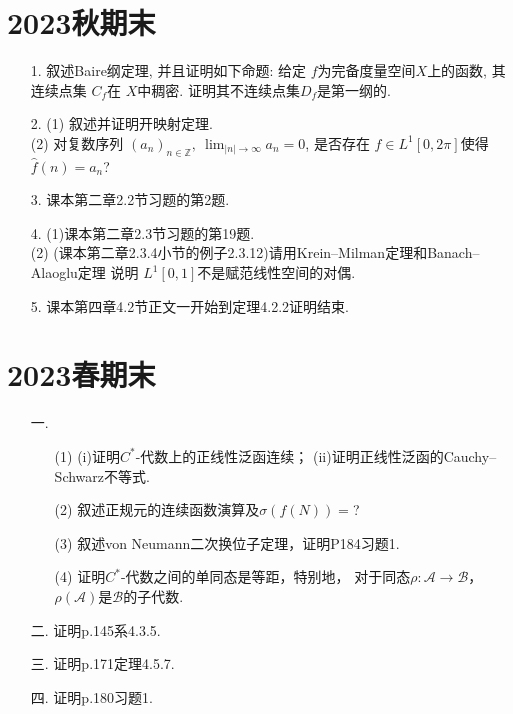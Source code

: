 \section{2023秋期末}
\begin{itemize}
\item[1.] 叙述Baire纲定理, 并且证明如下命题: 给定 $f$为完备度量空间$X$上的函数, 
其连续点集 $C_f$在 $X$中稠密. 证明其不连续点集$D_f$是第一纲的.

\item[2.] 
(1) 叙述并证明开映射定理.\\
(2) 对复数序列 $(a_n)_{n\in\mathbb{Z}},\ \lim_{|n|\to \infty}a_n=0$, 
是否存在 $f\in L^1[0,2\pi]$使得 $\hat{f}(n)=a_n$?

\item[3.] 课本第二章2.2节习题的第2题.

\item[4.]
(1)课本第二章2.3节习题的第19题.\\
(2) (课本第二章2.3.4小节的例子2.3.12)请用Krein--Milman定理和Banach--Alaoglu定理
说明 $L^1[0,1]$不是赋范线性空间的对偶.

\item[5.] 课本第四章4.2节正文一开始到定理4.2.2证明结束.
\end{itemize}

\section{2023春期末}
\begin{itemize}
\item[一.]
\begin{itemize}
    \item[(1)](i)证明$C^*$-代数上的正线性泛函连续；
    (ii)证明正线性泛函的Cauchy--Schwarz不等式.
    \item[(2)]叙述正规元的连续函数演算及$\sigma(f(N))=$?
    \item[(3)]叙述von Neumann二次换位子定理，证明P184习题1.
    \item[(4)]证明$C^*$-代数之间的单同态是等距，特别地，
    对于同态$\rho:\mathcal{A}\to \mathcal{B}$，
    $\rho(\mathcal{A})$是$\mathcal{B}$的子代数.
\end{itemize}
\item[二.]
证明p.145系4.3.5.
\item[三.]
证明p.171定理4.5.7.
\item[四.]
证明p.180习题1.
\end{itemize}